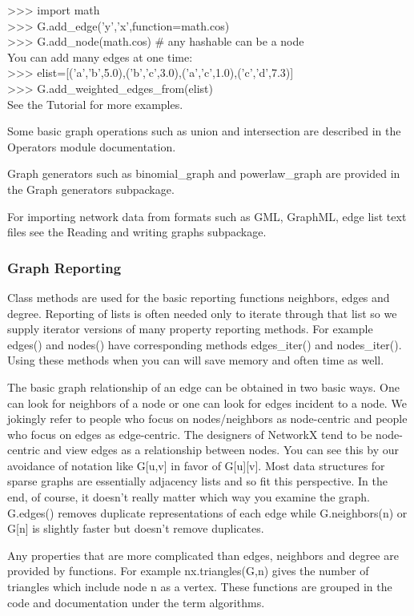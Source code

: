 >>> import math\\
>>> G.add_edge('y','x',function=math.cos)\\
>>> G.add_node(math.cos) # any hashable can be a node\\
You can add many edges at one time:\\

>>> elist=[('a','b',5.0),('b','c',3.0),('a','c',1.0),('c','d',7.3)]\\
>>> G.add_weighted_edges_from(elist)\\
See the Tutorial for more examples.

Some basic graph operations such as union and intersection are described in the Operators module documentation.

Graph generators such as binomial_graph and powerlaw_graph are provided in the Graph generators subpackage.

For importing network data from formats such as GML, GraphML, edge list text files see the Reading and writing graphs subpackage.

\subsubsection{Graph Reporting}
Class methods are used for the basic reporting functions neighbors, edges and degree. Reporting of lists is often needed only to iterate through that list so we supply iterator versions of many property reporting methods. For example edges() and nodes() have corresponding methods edges\_iter() and nodes\_iter(). Using these methods when you can will save memory and often time as well.

The basic graph relationship of an edge can be obtained in two basic ways. One can look for neighbors of a node or one can look for edges incident to a node. We jokingly refer to people who focus on nodes/neighbors as node-centric and people who focus on edges as edge-centric. The designers of NetworkX tend to be node-centric and view edges as a relationship between nodes. You can see this by our avoidance of notation like G[u,v] in favor of G[u][v]. Most data structures for sparse graphs are essentially adjacency lists and so fit this perspective. In the end, of course, it doesn’t really matter which way you examine the graph. G.edges() removes duplicate representations of each edge while G.neighbors(n) or G[n] is slightly faster but doesn’t remove duplicates.

Any properties that are more complicated than edges, neighbors and degree are provided by functions. For example nx.triangles(G,n) gives the number of triangles which include node n as a vertex. These functions are grouped in the code and documentation under the term algorithms.
